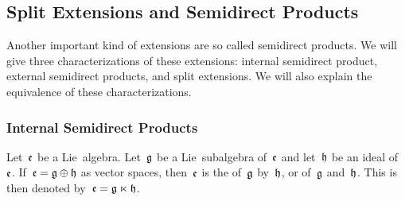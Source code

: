 %  



\subsection{Split Extensions and Semidirect Products}

\begin{fluff}
	Another important kind of extensions are so called semidirect products.
	We will give three characterizations of these extensions:
	internal semidirect product, external semidirect products, and split extensions.
	We will also explain the equivalence of these characterizations.
\end{fluff}

\subsubsection{Internal Semidirect Products}


\begin{definition}
	Let~$\mathfrak{e}$ be a Lie~algebra.
	Let~$\mathfrak{g}$ be a Lie~subalgebra of~$\mathfrak{e}$ and let~$\mathfrak{h}$ be an ideal of~$\mathfrak{e}$.
	If~$\mathfrak{e} = \mathfrak{g} \oplus \mathfrak{h}$ as vector spaces, then~$\mathfrak{e}$ is the  of~$\mathfrak{g}$ by~$\mathfrak{h}$, or of~$\mathfrak{g}$ and~$\mathfrak{h}$.
	This is then denoted by~$\mathfrak{e} = \mathfrak{g} \ltimes \mathfrak{h}$.
\end{definition}


